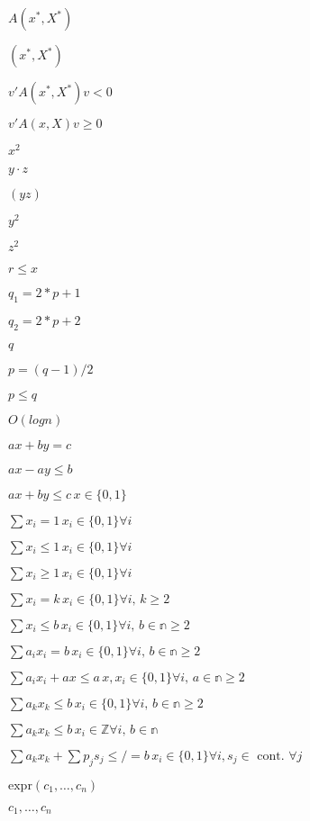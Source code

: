 \documentclass{article}
\begin{document}
$ A(x^*,X^*) $
\pagebreak

$ (x^*,X^*) $
\pagebreak

$ v' A(x^*,X^*) v < 0 $
\pagebreak

$ v' A(x,X) v \ge 0 $
\pagebreak

$x^2$
\pagebreak

$y \cdot z$
\pagebreak

$(yz)$
\pagebreak

$y^2$
\pagebreak

$z^2$
\pagebreak

$ r \leq x $
\pagebreak

$ q_1 = 2*p+1 $
\pagebreak

$ q_2 = 2*p+2 $
\pagebreak

$ q $
\pagebreak

$ p = (q-1)/2 $
\pagebreak

$ p \leq q $
\pagebreak

$ O(log n) $
\pagebreak

$ ax + by = c$
\pagebreak

$ a x - a y \leq b$
\pagebreak

$ ax + by \leq c \, x \in \{0,1\} $
\pagebreak

$ \sum x_i = 1\, x_i \in \{0,1\} \forall i $
\pagebreak

$ \sum x_i \leq 1\, x_i \in \{0,1\} \forall i $
\pagebreak

$ \sum x_i \geq 1\, x_i \in \{0,1\} \forall i $
\pagebreak

$ \sum x_i = k\, x_i \in \{0,1\} \forall i, \, k\geq 2 $
\pagebreak

$ \sum x_i \leq b\, x_i \in \{0,1\} \forall i, \, b\in \mathbb{n} \geq 2 $
\pagebreak

$ \sum a_i x_i = b\, x_i \in \{0,1\} \forall i, \, b\in \mathbb{n} \geq 2 $
\pagebreak

$ \sum a_i x_i + a x \leq a\, x, x_i \in \{0,1\} \forall i, \, a\in \mathbb{n} \geq 2 $
\pagebreak

$ \sum a_k x_k \leq b\, x_i \in \{0,1\} \forall i, \, b\in \mathbb{n} \geq 2 $
\pagebreak

$ \sum a_k x_k \leq b\, x_i \in \mathbb{Z} \forall i, \, b\in \mathbb{n} $
\pagebreak

$ \sum a_k x_k + \sum p_j s_j \leq/= b\, x_i \in \{0,1\} \forall i, s_j \in \text{ cont. } \forall j$
\pagebreak

$ \text{expr}(c_1, \ldots, c_n) $
\pagebreak

$ c_1, \ldots, c_n $
\pagebreak
\end{document}
